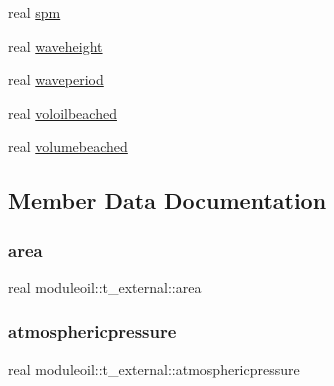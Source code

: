 \begin{DoxyCompactItemize}
\item 
real \mbox{\hyperlink{structmoduleoil_1_1t__external_ab1271b0d7701cf73c7fd3099f398d8ba}{spm}}
\item 
real \mbox{\hyperlink{structmoduleoil_1_1t__external_a35e41a628c75d2b258b8e9aba843dcda}{waveheight}}
\item 
real \mbox{\hyperlink{structmoduleoil_1_1t__external_a8b0113676d10411a3821c6c932de0001}{waveperiod}}
\item 
real \mbox{\hyperlink{structmoduleoil_1_1t__external_a63f5dcd4d9607bc23ab1ce52242cc2ca}{voloilbeached}}
\item 
real \mbox{\hyperlink{structmoduleoil_1_1t__external_a3e7d310413dbf72b29d984e04b2e68ca}{volumebeached}}
\end{DoxyCompactItemize}


\subsection{Member Data Documentation}
\mbox{\label{structmoduleoil_1_1t__external_aa7f8e6e2f4f35995c55819561957f356}} 
\subsubsection{\texorpdfstring{area}{area}}
{\footnotesize\ttfamily real moduleoil\+::t\+\_\+external\+::area\hspace{0.3cm}{\ttfamily [private]}}

\mbox{\label{structmoduleoil_1_1t__external_a8798697fe1d235264fb6be12004a8c4e}} 
\subsubsection{\texorpdfstring{atmosphericpressure}{atmosphericpressure}}
{\footnotesize\ttfamily real moduleoil\+::t\+\_\+external\+::atmosphericpressure\hspace{0.3cm}{\ttfamily [private]}}

\mbox{\label{structmoduleoil_1_1t__external_a290d5e8747987992b0b1e4456e4d6925}} 
